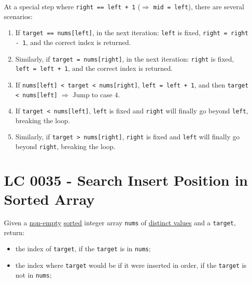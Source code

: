 At a special step where {\colorbox{CodeBackground}{\lstinline|right == left + 1|}} ($\Rightarrow$ {\colorbox{CodeBackground}{\lstinline|mid = left|}}), there are several scenarios:
\begin{enumerate}
\item If {\colorbox{CodeBackground}{\lstinline|target == nums[left]|}}, in the next iteration: {\colorbox{CodeBackground}{\lstinline|left|}} is fixed, {\colorbox{CodeBackground}{\lstinline|right = right - 1|}}, and the correct index is returned.
\item Similarly, if {\colorbox{CodeBackground}{\lstinline|target = nums[right]|}}, in the next iteration: {\colorbox{CodeBackground}{\lstinline|right|}} is fixed, {\colorbox{CodeBackground}{\lstinline|left = left + 1|}}, and the correct index is returned.
\item If {\colorbox{CodeBackground}{\lstinline|nums[left] < target < nums[right]|}}, {\colorbox{CodeBackground}{\lstinline|left = left + 1|}}, and then {\colorbox{CodeBackground}{\lstinline|target < nums[left]|}} $\Rightarrow$ Jump to case $4$.
\item If {\colorbox{CodeBackground}{\lstinline|target < nums[left]|}}, {\colorbox{CodeBackground}{\lstinline|left|}} is fixed and {\colorbox{CodeBackground}{\lstinline|right|}} will finally go beyond {\colorbox{CodeBackground}{\lstinline|left|}}, breaking the loop.
\item Similarly, if {\colorbox{CodeBackground}{\lstinline|target > nums[right]|}}, {\colorbox{CodeBackground}{\lstinline|right|}} is fixed and {\colorbox{CodeBackground}{\lstinline|left|}} will finally go beyond {\colorbox{CodeBackground}{\lstinline|right|}}, breaking the loop.
\end{enumerate}

\section{LC 0035 - Search Insert Position in Sorted Array}
Given a \ul{non-empty} \ul{sorted} integer array {\colorbox{CodeBackground}{\lstinline|nums|}} of \ul{distinct values} and a {\colorbox{CodeBackground}{\lstinline|target|}}, return:
\begin{itemize}
	\item the index of {\colorbox{CodeBackground}{\lstinline|target|}}, if the {\colorbox{CodeBackground}{\lstinline|target|}} is in {\colorbox{CodeBackground}{\lstinline|nums|}};
	\item the index where {\colorbox{CodeBackground}{\lstinline|target|}} would be if it were inserted in order, if the {\colorbox{CodeBackground}{\lstinline|target|}} is not in {\colorbox{CodeBackground}{\lstinline|nums|}};
\end{itemize}

